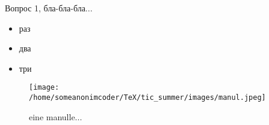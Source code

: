 
Вопрос 1, бла-бла-бла...

\begin{itemize}
\item раз
\item два
\item три
\end{itemize}

\begin{figure}[htp]
\centering
\texttt{[image: /home/someanonimcoder/TeX/tic\_summer/images/manul.jpeg]}
\caption{eine manulle...}
\label{}
\end{figure}
